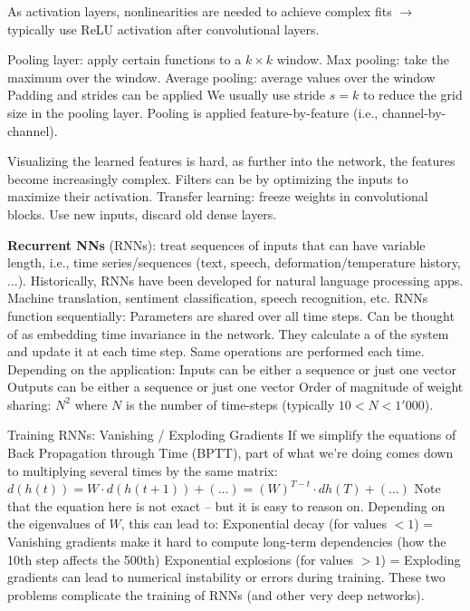 As activation layers, nonlinearities are needed to achieve complex fits $\rightarrow$ typically use ReLU activation after convolutional layers.

Pooling layer: apply certain functions to a $k\times k$ window.
Max pooling: take the maximum over the window.
Average pooling: average values over the window
Padding and strides can be applied
We usually use stride $s=k$ to reduce the grid size in the pooling layer.
Pooling is applied feature-by-feature (i.e., channel-by-channel).

Visualizing the learned features is hard, as further into the network, the features become increasingly complex. 
Filters can be  by optimizing the inputs to maximize their activation.
Transfer learning: freeze weights in convolutional blocks. Use new inputs, discard old dense layers.

\textbf{Recurrent NNs} (RNNs): treat sequences of inputs that can have variable length, i.e., time series/sequences (text, speech, deformation/temperature history, ...).
Historically, RNNs have been developed for natural language processing apps.
Machine translation, sentiment classification, speech recognition, etc.
RNNs function sequentially:
Parameters are shared over all time steps.
Can be thought of as embedding time invariance in the network.
They calculate a  of the system and update it at each time step. 
Same operations are performed each time. Depending on the application:
Inputs can be either a sequence or just one vector
Outputs can be either a sequence or just one vector
Order of magnitude of weight sharing: $N^2$ where $N$ is the number of time-steps (typically $10 < N < 1'000$).

Training RNNs: Vanishing / Exploding Gradients
If we simplify the equations of Back Propagation through Time (BPTT), part of what we’re doing comes down to multiplying several times by the same matrix:
$d(h(t)) = W\cdot d(h(t+1)) + (...) = (W)^{T-t}\cdot dh(T) + (...)$
Note that the equation here is not exact – but it is easy to reason on.
Depending on the eigenvalues of $W$, this can lead to:
Exponential decay (for values $<1$) = 
Vanishing gradients make it hard to compute long-term dependencies (how the 10th step affects the 500th) Exponential explosions (for values $>1$) = 
Exploding gradients can lead to numerical instability or errors during training.
These two problems complicate the training of RNNs (and other very deep networks).

